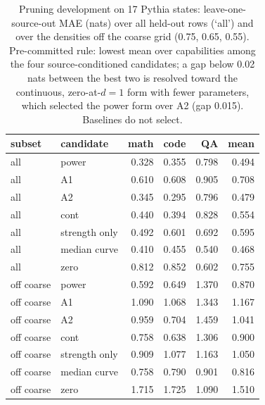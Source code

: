 \begin{table}[t]\centering\footnotesize
\begin{tabular}{@{}llrrrr@{}}
\toprule
subset & candidate & math & code & QA & mean \\
\midrule
all & power & 0.328 & 0.355 & 0.798 & 0.494 \\
all & A1 & 0.610 & 0.608 & 0.905 & 0.708 \\
all & A2 & 0.345 & 0.295 & 0.796 & 0.479 \\
all & cont & 0.440 & 0.394 & 0.828 & 0.554 \\
all & strength only & 0.492 & 0.601 & 0.692 & 0.595 \\
all & median curve & 0.410 & 0.455 & 0.540 & 0.468 \\
all & zero & 0.812 & 0.852 & 0.602 & 0.755 \\
off coarse & power & 0.592 & 0.649 & 1.370 & 0.870 \\
off coarse & A1 & 1.090 & 1.068 & 1.343 & 1.167 \\
off coarse & A2 & 0.959 & 0.704 & 1.459 & 1.041 \\
off coarse & cont & 0.758 & 0.638 & 1.306 & 0.900 \\
off coarse & strength only & 0.909 & 1.077 & 1.163 & 1.050 \\
off coarse & median curve & 0.758 & 0.790 & 0.901 & 0.816 \\
off coarse & zero & 1.715 & 1.725 & 1.090 & 1.510 \\
\bottomrule\end{tabular}
\caption{Pruning development on 17 Pythia states: leave-one-source-out MAE (nats) over all held-out rows (`all') and over the densities off the coarse grid (0.75, 0.65, 0.55). Pre-committed rule: lowest mean over capabilities among the four source-conditioned candidates; a gap below 0.02 nats between the best two is resolved toward the continuous, zero-at-$d{=}1$ form with fewer parameters, which selected the power form over A2 (gap 0.015). Baselines do not select.}
\label{tab:v53_loso}\end{table}
